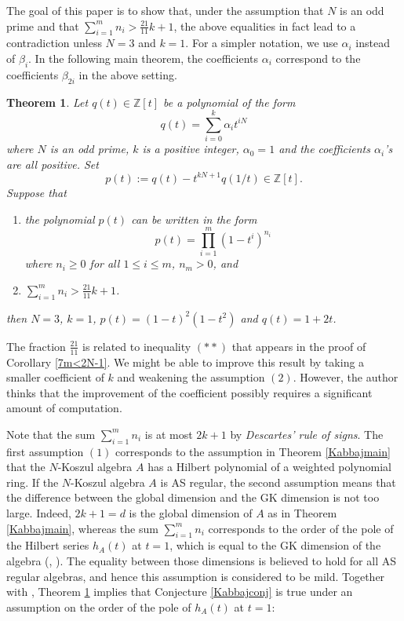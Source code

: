 \documentclass[reqno]{amsart}
\newcommand{\Zint}{\mathbb{Z}}
\numberwithin{equation}{section}
\theoremstyle{plain}
\newtheorem{thm}[equation]{Theorem}
\theoremstyle{definition}
\begin{document}
The goal of this paper is to show that, under the assumption that $N$ is an odd prime and that $\sum^m_{i=1}n_i>\frac{21}{11}k+1$, the above equalities in fact lead to a contradiction unless $N=3$ and $k=1$. For a simpler notation, we use $\alpha_i$ instead of $\beta_i$. In the following main theorem, the coefficients $\alpha_i$ correspond to the coefficients $\beta_{2i}$ in the above setting.

\begin{thm}\label{main}
    Let $q(t)\in\Zint[t]$ be a polynomial of the form
    $$q(t)=\sum^k_{i=0}\alpha_it^{iN}$$
    where $N$ is an odd prime, $k$ is a positive integer, $\alpha_0=1$ and the coefficients $\alpha_i$'s are all positive. Set
    $$p(t):=q(t)-t^{kN+1}q(1/t)\in\Zint[t].$$
    Suppose that
    \begin{enumerate}
        \item the polynomial $p(t)$ can be written in the form
    $$p(t)=\prod^m_{i=1}(1-t^i)^{n_i}$$
    where $n_i\geq0$ for all $1\leq i\leq m$, $n_m>0$, and
       \item $\sum_{i=1}^mn_i>\frac{21}{11}k+1$.
    \end{enumerate}
     then $N=3$, $k=1$, $p(t)=(1-t)^2(1-t^2)$ and $q(t)=1+2t$.
\end{thm}

The fraction $\frac{21}{11}$ is related to  inequality $(**)$ that appears in the proof of Corollary \ref{7m<2N-1}. We might be able to improve this result by taking a smaller coefficient of $k$ and weakening the assumption $(2)$. However, the author thinks that the improvement of the coefficient possibly requires a significant amount of computation. 

Note that the sum $\sum_{i=1}^mn_i$ is at most $2k+1$ by \emph{Descartes' rule of signs}.
The first assumption $(1)$ corresponds to the assumption in Theorem \ref{Kabbajmain} that the $N$-Koszul algebra $A$ has a Hilbert polynomial of a weighted polynomial ring. If the $N$-Koszul algebra $A$ is AS regular, the second assumption means that the difference between the global dimension and the GK dimension is not too large. Indeed, $2k+1=d$ is the global dimension of $A$ as in Theorem \ref{Kabbajmain}, whereas the sum $\sum_{i=1}^m n_i$ corresponds to the order of the pole of the Hilbert series $h_A(t)$ at $t=1$, which is equal to the GK dimension of the algebra (\cite[Proposition 2.21]{ArtinTateVandenBergh}, \cite[Corollary 2.2]{StephensonZhang}). The equality between those dimensions is believed to hold for all AS regular algebras, and hence this assumption is considered to be mild. Together with \cite[Remark 3.2]{Kabbaj}, Theorem \ref{main} implies that Conjecture \ref{Kabbajconj} is true under an assumption on the order of the pole of $h_A(t)$ at $t=1$:
\end{document}
